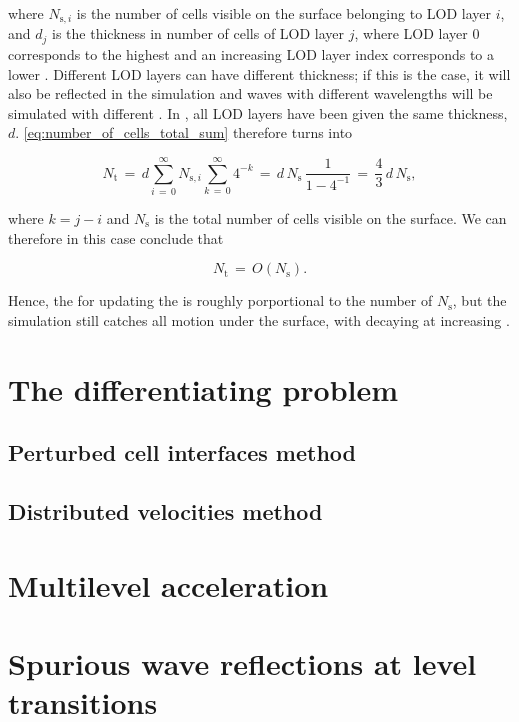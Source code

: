 where $N_{\text{s},i}$ is the number of cells visible on the surface belonging to LOD layer $i$, and $d_j$ is the thickness in number of cells of LOD layer $j$, where LOD layer $0$ corresponds to the highest \LOD and an increasing LOD layer index corresponds to a lower \LOD. Different LOD layers can have different thickness; if this is the case, it will also be reflected in the simulation and waves with different wavelengths will be simulated with different \accuracy. In \thiswork, all LOD layers have been given the same thickness, $d$. \eqref{eq:number_of_cells_total_sum} therefore turns into

\begin{equation} \label{eq:number_of_cells_total}
N_{\text{t}} \,=\, d\sum_{i\,=\,0}^\infty N_{\text{s},i}\sum_{k\,=\,0}^\infty 4^{-k} \,=\, d\,N_{\text{s}}\,\frac{1}{1-4^{-1}} \,=\, \frac{4}{3}\,d\,N_{\text{s}},
\end{equation}

where $k = j-i$ and $N_{\text{s}}$ is the total number of cells visible on the surface. We can therefore in this case conclude that

\begin{equation} \label{eq:number_of_cells_total_ordo}
N_{\text{t}} \,=\, O(N_{\text{s}}).
\end{equation}

Hence, the  for updating the  is roughly porportional to the number of  $N_{\text{s}}$, but the simulation still catches all motion under the surface, with decaying \precision at increasing .

\section{The differentiating problem}

\subsection{Perturbed cell interfaces method}

\subsection{Distributed velocities method}

\section{Multilevel acceleration}

\section{Spurious wave reflections at level transitions}